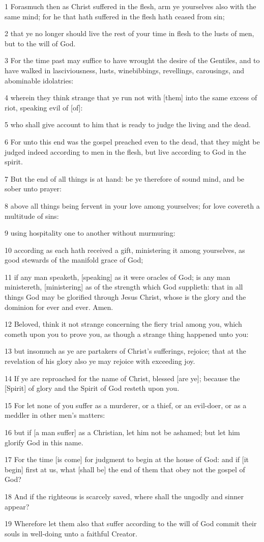 \par 1 Forasmuch then as Christ suffered in the flesh, arm ye yourselves also with the same mind; for he that hath suffered in the flesh hath ceased from sin;
\par 2 that ye no longer should live the rest of your time in flesh to the lusts of men, but to the will of God.
\par 3 For the time past may suffice to have wrought the desire of the Gentiles, and to have walked in lasciviousness, lusts, winebibbings, revellings, carousings, and abominable idolatries:
\par 4 wherein they think strange that ye run not with [them] into the same excess of riot, speaking evil of [of]:
\par 5 who shall give account to him that is ready to judge the living and the dead.
\par 6 For unto this end was the gospel preached even to the dead, that they might be judged indeed according to men in the flesh, but live according to God in the spirit.
\par 7 But the end of all things is at hand: be ye therefore of sound mind, and be sober unto prayer:
\par 8 above all things being fervent in your love among yourselves; for love covereth a multitude of sins:
\par 9 using hospitality one to another without murmuring:
\par 10 according as each hath received a gift, ministering it among yourselves, as good stewards of the manifold grace of God;
\par 11 if any man speaketh, [speaking] as it were oracles of God; is any man ministereth, [ministering] as of the strength which God supplieth: that in all things God may be glorified through Jesus Christ, whose is the glory and the dominion for ever and ever. Amen.
\par 12 Beloved, think it not strange concerning the fiery trial among you, which cometh upon you to prove you, as though a strange thing happened unto you:
\par 13 but insomuch as ye are partakers of Christ's sufferings, rejoice; that at the revelation of his glory also ye may rejoice with exceeding joy.
\par 14 If ye are reproached for the name of Christ, blessed [are ye]; because the [Spirit] of glory and the Spirit of God resteth upon you.
\par 15 For let none of you suffer as a murderer, or a thief, or an evil-doer, or as a meddler in other men's matters:
\par 16 but if [a man suffer] as a Christian, let him not be ashamed; but let him glorify God in this name.
\par 17 For the time [is come] for judgment to begin at the house of God: and if [it begin] first at us, what [shall be] the end of them that obey not the gospel of God?
\par 18 And if the righteous is scarcely saved, where shall the ungodly and sinner appear?
\par 19 Wherefore let them also that suffer according to the will of God commit their souls in well-doing unto a faithful Creator.

